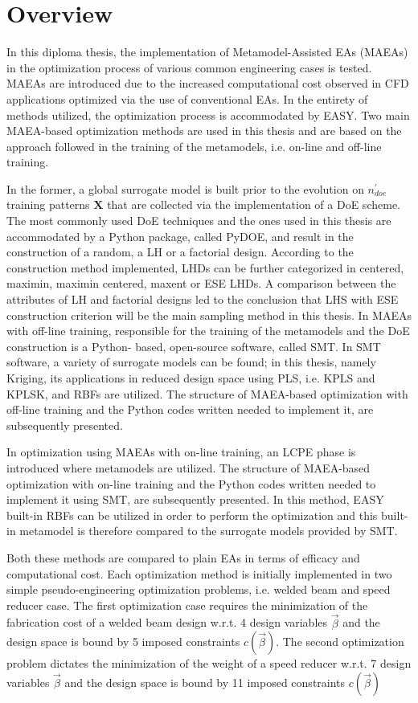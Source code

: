\section{Overview}
In this diploma thesis, the implementation of Metamodel-Assisted 
EAs (MAEAs) in the optimization process of various common 
engineering cases is tested. MAEAs are introduced due to the 
increased computational cost observed in CFD applications optimized 
via the use of conventional EAs. In the entirety of methods 
utilized, the optimization process is accommodated by EASY.
Two main MAEA-based optimization methods are used in this thesis 
and are based on the approach followed in the training of 
the metamodels, i.e. on-line and off-line training. 

In the former, a global surrogate model is built prior to the 
evolution on $n_{doe}^{'}$ training patterns $\mathbf{X}$ that are
collected via the implementation of a DoE scheme. The most commonly
used DoE techniques and the ones used in this thesis are 
accommodated by a Python package, called PyDOE, and result in the 
construction of a random, a LH or a factorial design. According to 
the construction method implemented, LHDs can be further 
categorized in centered, maximin, maximin centered, maxent 
or ESE LHDs. A comparison between the attributes of LH and 
factorial designs led to the conclusion that LHS with ESE 
construction criterion will be the main sampling method in this 
thesis. In MAEAs with off-line training, responsible for the 
training of the metamodels and the DoE construction is a Python-
based, open-source software, called SMT. In SMT software, a variety 
of surrogate models can be found; in this thesis, namely Kriging, 
its applications in reduced design space using PLS, i.e. KPLS and 
KPLSK, and RBFs are utilized. The structure of MAEA-based 
optimization with off-line training and the Python codes written 
needed to implement it, are subsequently presented. 

In optimization using MAEAs with on-line training, an LCPE phase is 
introduced where metamodels are utilized. The structure of 
MAEA-based optimization with on-line training and the Python codes 
written needed to implement it using SMT, are subsequently 
presented. In this method, EASY built-in RBFs can be utilized in 
order to perform the optimization and this built-in metamodel is 
therefore compared to the surrogate models provided by SMT.

Both these methods are compared to plain EAs in terms of efficacy 
and computational cost. Each optimization method is initially 
implemented in two simple pseudo-engineering optimization problems, 
i.e. welded beam and speed reducer case. The first optimization 
case requires the minimization of the fabrication cost of a welded 
beam design w.r.t. 4 design variables $\vec{β}$ and the design 
space is bound by 5 imposed constraints $c(\vec{β})$. The second
optimization problem dictates the minimization of the weight of a 
speed reducer w.r.t. 7 design variables $\vec{β}$ and the design 
space is bound by 11 imposed constraints $c(\vec{β})$ 

